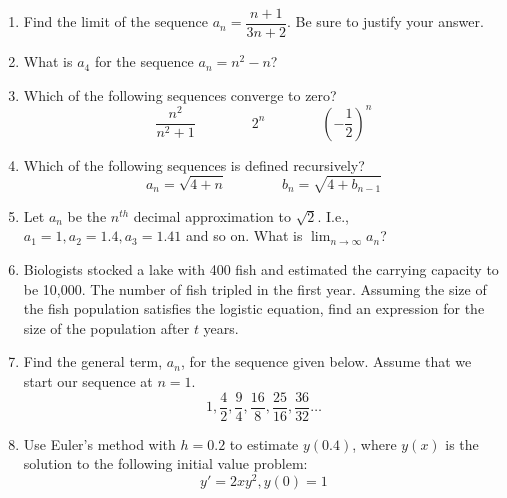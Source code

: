 \documentclass{nosvagor-notes}
\newcommand*{\TickSize}{2pt}%
\begin{document}
\begin{enumerate}

  \newpage

  \item Find the limit of the sequence \(a_n = \dfrac{n+1}{3n+2}\). Be sure to justify your answer.
  \vspace{256pt}

  \item What is \(a_4\) for the sequence \(a_n = n^2 - n\)?
    \vspace{40pt}

  \item Which of the following sequences converge to zero?
    \[%
      \frac{n^2}{n^2+1} \qquad\qquad 2^n \qquad\qquad \left( -\frac{1}{2} \right) ^n
    \]%
    \vspace{40pt}

  \item Which of the following sequences is defined recursively?
    \[%
    a_n = \sqrt{4+n} \qquad \qquad b_n = \sqrt{4+b_{n-1}}
    \]%
    \vspace{40pt}

  \item Let \(a_n\) be the \(n^{th}\) decimal approximation to \(\sqrt{2} \).
    I.e., \(a_1 = 1, a_2 = 1.4, a_3 = 1.41\) and so on. What is \(\lim_{n \to
    \infty} a_n\)?
  \newpage

  \item Biologists stocked a lake with 400 fish and estimated the carrying
    capacity to be 10,000. The number of fish tripled in the first year.
    Assuming the size of the fish population satisfies the logistic equation,
    find an expression for the size of the population after \(t\) years.

  \newpage

  \item Find the general term, \(a_n\), for the sequence given below. Assume that
  we start our sequence at \(n=1\).
  \[%
    1,\frac{4}{2}, \frac{9}{4}, \frac{16}{8}, \frac{25}{16}, \frac{36}{32}\ldots
  \]%
  \vspace{140pt}

  \item Use Euler’s method with \(h= 0 .2\) to estimate \(y(0.4)\), where \(y(x)\) is the
    solution to the following initial value problem:
    \[%
      y' = 2xy^2, y(0) = 1
    \]%
    \vspace{140pt}


\end{enumerate}
\end{document}
